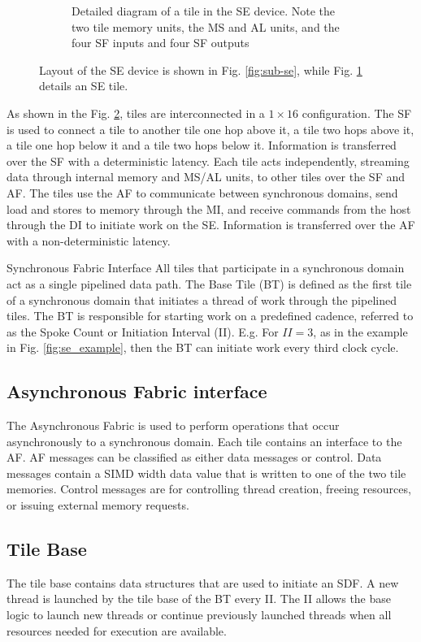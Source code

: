 \begin{figure} [h]
\begin{subfigure}{.5\textwidth}
  \caption{Detailed diagram of a tile in the SE device.
  Note the two tile memory units, the MS and AL units, and the four SF inputs and four SF outputs}
  \label{fig:sub-tile}
  \end{subfigure}
  \caption{
    Layout of the SE device is shown in Fig. \ref{fig:sub-se}, while Fig. \ref{fig:sub-tile} details an SE tile.
  }
  \label{fig:se_diagram}
\end{figure}

As shown in the Fig. \ref{fig:se_diagram}, tiles are interconnected in a $1 \times 16$ configuration.
The SF is used to connect a tile to another tile one hop above it, a tile two hops above it, a tile one hop below it and a tile two hops below it.
Information is transferred over the SF with a deterministic latency. 
Each tile acts independently, streaming data through internal memory and MS/AL units, to other tiles over the SF and AF.
The tiles use the AF to communicate between synchronous domains, send load and stores to memory through the MI, and receive commands from the host through the DI to initiate work on the SE.
Information is transferred over the AF with a non-deterministic latency.


\par{Synchronous Fabric Interface}
All tiles that participate in a synchronous domain act as a single pipelined data path.
The Base Tile (BT) is defined as the first tile of a synchronous domain that initiates a thread of work through the pipelined tiles.
The BT is responsible for starting work on a predefined cadence, referred to as the Spoke Count or Initiation Interval (II).
E.g. For $II = 3$, as in the example in Fig. \ref{fig:se_example}, then the BT can initiate work every third clock cycle.

\subsection{Asynchronous Fabric interface}
The Asynchronous Fabric is used to perform operations that occur asynchronously to a synchronous domain.
Each tile contains an interface to the AF.
AF messages can be classified as either data messages or control.
Data messages contain a SIMD width data value that is written to one of the two tile memories.
Control messages are for controlling thread creation, freeing resources, or issuing external memory requests.

\subsection{Tile Base}
The tile base contains data structures that are used to initiate an SDF.
A new thread is launched by the tile base of the BT every II.
The II allows the base logic to launch new threads or continue previously launched threads when all resources needed for execution are available.

